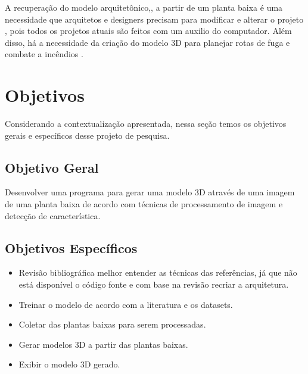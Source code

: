 
A recuperação do modelo arquitetônico,, a partir de um planta baixa é uma necessidade que arquitetos e designers precisam para modificar e alterar o projeto \cite{lv2021residential}, pois todos os projetos atuais \iffalse achismo sem referencia \fi são feitos com um auxilio do computador.
Além disso, há a necessidade da criação do modelo 3D para planejar rotas de fuga e combate a incêndios \cite{kratochvila2024multi}.


\section{Objetivos}\label{cp:intro:obj}
Considerando a contextualização apresentada, nessa seção temos os objetivos gerais e específicos desse projeto de pesquisa.

\subsection{Objetivo Geral}\label{cp:intro:objgeral}
Desenvolver uma programa para gerar uma modelo 3D através de uma imagem de uma planta baixa de acordo com técnicas de processamento de imagem e detecção de característica. %

\subsection{Objetivos Específicos}\label{cp:intro:objespec}
\begin{itemize}
  \item Revisão bibliográfica melhor entender as técnicas das referências, já que não está disponível o código fonte e com base na revisão recriar a arquitetura.
  \item Treinar o modelo de acordo com a literatura e os datasets. %
  \item Coletar das plantas baixas para serem processadas. %
  \item Gerar modelos 3D a partir das plantas baixas. %
  \item Exibir o modelo 3D gerado.%
\end{itemize}


